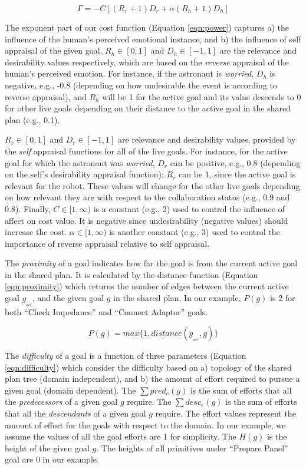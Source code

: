 \documentclass[12pt]{report}
\begin{document}
\begin{equation}
\Gamma=-C[(R_r+1)D_r + \alpha(R_h+1)D_h]
\label{eqn:power}
\end{equation}

The exponent part of our cost function (Equation \ref{eqn:power}) captures a)
the influence of the human's perceived emotional instance, and b) the influence
of self appraisal of the given goal. $R_h\in[0,1]$ and $D_h\in[-1,1]$ are the
relevance and desirability values respectively, which are based on the
\textit{reverse} appraisal of the human's perceived emotion. For instance, if
the astronaut is \textit{worried}, $D_h$ is negative, e.g., -0.8 (depending on
how undesirable the event is according to reverse appraisal), and $R_h$ will be
1 for the active goal and its value descends to 0 for other live goals depending
on their distance to the active goal in the shared plan (e.g., 0.1).

$R_r\in[0,1]$ and $D_r\in[-1,1]$ are relevance and desirability values, provided
by the \textit{self} appraisal functions for all of the live goals. For
instance, for the active goal for which the astronaut was \textit{worried},
$D_r$ can be positive, e.g., 0.8 (depending on the self's desirability appraisal
function); $R_r$ can be 1, since the active goal is relevant for the robot.
These values will change for the other live goals depending on how
relevant they are with respect to the collaboration status (e.g., 0.9 and 0.8).
Finally, $C\in[1,\infty)$ is a constant (e.g., 2) used to control the influence
of affect on cost value. It is negative since undesirability (negative values)
should increase the cost. $\alpha\in[1,\infty)$ is another constant (e.g., 3)
used to control the importance of reverse appraisal relative to self appraisal.

The \textit{proximity} of a goal indicates how far the goal is from the current
active goal in the shared plan. It is calculated by the distance function
(Equation \ref{eqn:proximity}) which returns the number of edges between the
current active goal $g_{_{act}}$, and the given goal $g$ in the shared plan. In
our example, $P(g)$ is 2 for both ``Check Impedance'' and ``Connect Adaptor''
goals.

\begin{equation}
P(g) = max\big\{1, distance(g_{_{act}},g)\big\}
\label{eqn:proximity}
\end{equation}

The \textit{difficulty} of a goal is a function of three parameters (Equation
\ref{eqn:difficulty}) which consider the difficulty based on a) topology of the
shared plan tree (domain independent), and b) the amount of effort required to
pursue a given goal (domain dependent). The $\sum pred_e(g)$ is the sum of
efforts that all the \textit{predecessors} of a given goal $g$ require. The
$\sum desc_e(g)$ is the sum of efforts that all the \textit{descendants} of a
given goal $g$ require. The effort values represent the amount of effort for the
goals with respect to the domain. In our example, we assume the values of all
the goal efforts are 1 for simplicity. The $H(g)$ is the height of the given
goal $g$. The heights of all primitives under ``Prepare Panel'' goal are 0 in
our example.
\end{document}
